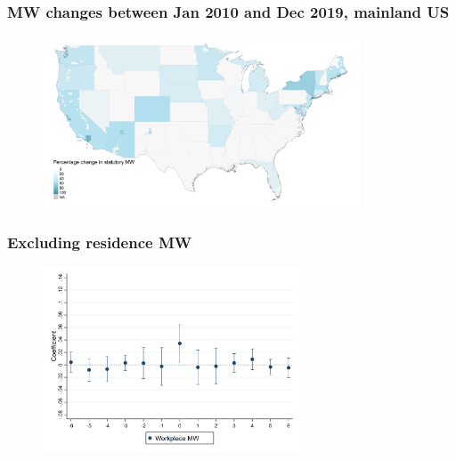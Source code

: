 \documentclass[aspectratio=169, t]{beamer}
\begin{document}
\begin{frame}[label=mw_changes_map]
    \frametitle{MW changes between Jan 2010 and Dec 2019, mainland US}

    \vspace{2mm}
    \begin{figure}        
        \includegraphics[width = 0.84\textwidth]{maps_mw_long_run/output/USchange_perc_statutory_mw.png}
    \end{figure}
    
    \hyperlink{dist_mw_changes}{}
\end{frame}

\begin{frame}[label = exclude_res]
    \frametitle{Excluding residence MW}

    \begin{figure}
        \centering
        \includegraphics[width=0.68\textwidth]{fd_baseline/output/fd_mw_wkp_only_dynamic.png}
    \end{figure}
    
    \hyperlink{dyn_baseline_plot}{}
\end{frame}
\end{document}

